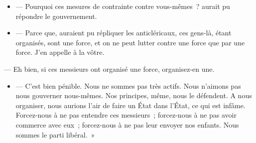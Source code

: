 \documentclass[french,twoside]{book} %
\begin{document}
\begin{itemize}[itemsep=0pt,]
\item  — Pourquoi ces mesures de contrainte contre vous-mêmes ? aurait pu répondre le gouvernement.
\item  — Parce que, auraient pu répliquer les anticléricaux, ces gens-là, étant organisés, sont une force, et on ne peut lutter contre une force que par une force. J’en appelle à la vôtre.
\end{itemize}

\noindent  — Eh bien, si ces messieurs ont organisé une force, organisez-en une.\par

\begin{itemize}[itemsep=0pt,]
\item  — C’est bien pénible. Nous ne sommes pas très actifs. Nous n’aimons pas nous gouverner nous-mêmes. Nos principes, même, nous le défendent. A nous organiser, nous aurions l’air de faire un État dans l’État, ce qui est infâme. Forcez-nous à ne pas entendre ces messieurs ; forcez-nous à ne pas avoir commerce avec eux ; forcez-nous à ne pas leur envoyer nos enfants. Nous sommes le parti libéral. »
\end{itemize}
\end{document}
